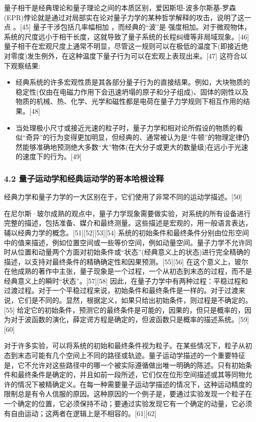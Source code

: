 量子相干是经典理论和量子理论之间的本质区别，爱因斯坦-波多尔斯基-罗森(EPR)悖论就是通过对局部实在论对量子力学的某种哲学解释的攻击，说明了这一点 。[45] 量子干涉包括几率幅相加 ，而经典的“波”是 强度相加。对于微观物体，系统的尺度远小于相干长度，这就导致了量子系统的长程纠缠等非局域现象。[46] 量子相干在宏观尺度上通常不明显，尽管这一规则可以在极低的温度下(即接近绝对零度)发生例外，在这种温度下量子行为可以在宏观上表现出来。[47] 这符合以下观察结果:
\begin{itemize}
\item 经典系统的许多宏观性质是其各部分量子行为的直接结果。例如，大块物质的稳定性(仅由在电磁力作用下会迅速坍塌的原子和分子组成)、固体的刚性以及物质的机械、热、化学、光学和磁性都是电荷在量子力学规则下相互作用的结果。[48]
\item 当处理极小尺寸或接近光速的粒子时，量子力学和相对论所假设的物质的看似“奇异”的行为变得更加明显，但经典的、通常被认为是“牛顿”的物理定律仍然能够准确地预测绝大多数“大”物体(在大分子或更大的数量级)在远小于光速的速度下的行为。[49]
\end{itemize}

\subsubsection{4.2 量子运动学和经典运动学的哥本哈根诠释}
经典力学和量子力学的一大区别在于，它们使用了非常不同的运动学描述。[50]

在尼尔斯·玻尔成熟的观点中，量子力学现象需要做实验，对系统的所有设备进行完整的描述，包括准备、媒介和最终测量。这些描述是宏观的，用一般语言表达，辅以经典力学的概念。[51][52][53][54] 系统的初始条件和最终条件分别由位形空间中的值来描述，例如位置空间或一些等价空间，例如动量空间。量子力学不允许同时从位置和动量两个方面对初始条件或“状态”(经典意义上的状态)进行完全精确的描述，以支持对最终条件的精确确定性和因果预测。[55][56] 在这个意义上，玻尔在他成熟的著作中主张，量子现象是一个过程，一个从初态到末态的过程，而不是经典意义上的瞬时“状态”。[57][58] 因此，在量子力学中有两种过程：平稳过程和过渡过程。对于一个平稳过程来说，初始条件和最终条件是一样的。对于过渡来说，它们是不同的。显然，根据定义，如果只给出初始条件，则过程是不确定的。[55] 给定它的初始条件，预测它的最终条件是可能的，因果的，但只是概率的，因为对于波函数的演化，薛定谔方程是确定的，但波函数只是概率的描述系统。[59][60]

对于许多实验，可以将系统的初始和最终条件视为粒子。在某些情况下，粒子从初态到末态可能有几个空间上不同的路径或轨迹。量子运动学描述的一个重要特征是，它不允许对这些路径中的哪一个被实际遵循做出唯一明确的陈述。只有初始条件和最终条件是确定的，并且如前一段所述，它们仅在位形空间描述或其等同物允许的情况下被精确定义。在每一种需要量子运动学描述的情况下，这种运动精度的限制总是有令人信服的原因。这种原因的一个例子是，要通过实验发现一个粒子在一个确定的位置，它必须保持不动；要通过实验发现它有一个确定的动量，它必须有自由运动；这两者在逻辑上是不相容的。[61][62]

